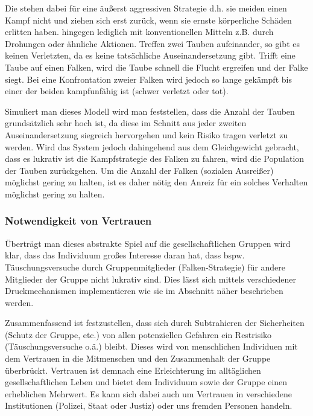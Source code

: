 Die  stehen dabei für eine äußerst aggressiven Strategie d.h. sie meiden einen Kampf nicht und ziehen sich erst zurück, wenn sie ernste körperliche Schäden erlitten haben.
 hingegen  lediglich mit konventionellen Mitteln z.B. durch Drohungen oder ähnliche Aktionen.
Treffen zwei Tauben aufeinander, so gibt es keinen Verletzten, da es keine tatsächliche Auseinandersetzung gibt.
Trifft eine Taube auf einen Falken, wird die Taube schnell die Flucht ergreifen und der Falke siegt.
Bei eine Konfrontation zweier Falken wird jedoch so lange gekämpft bis einer der beiden kampfunfähig ist (schwer verletzt oder tot).

Simuliert man dieses Modell wird man feststellen, dass die Anzahl der Tauben grundsätzlich sehr hoch ist, da diese im Schnitt aus jeder zweiten Auseinandersetzung siegreich hervorgehen und kein Risiko tragen verletzt zu werden.
Wird das System jedoch dahingehend aus dem Gleichgewicht gebracht, dass es lukrativ ist die Kampfstrategie des Falken zu fahren, wird die Population der Tauben zurückgehen.
Um die Anzahl der Falken (sozialen Ausreißer) möglichst gering zu halten, ist es daher nötig den Anreiz für ein solches Verhalten möglichst gering zu halten.
\cite{tauben-falken}

\subsubsection{Notwendigkeit von Vertrauen}\label{sec:notwendigkeit-von-vertauen}
Überträgt man dieses abstrakte Spiel auf die gesellschaftlichen Gruppen wird klar, dass das Individuum großes Interesse daran hat, dass bspw. Täuschungsversuche durch Gruppenmitglieder (Falken-Strategie) für andere Mitglieder der Gruppe nicht lukrativ sind.
Dies lässt sich mittels verschiedener Druckmechanismen implementieren wie sie im Abschnitt  näher beschrieben werden.

Zusammenfassend ist festzustellen, dass sich durch Subtrahieren der Sicherheiten (Schutz der Gruppe, etc.) von allen potenziellen Gefahren ein Restrisiko (Täuschungsversuche o.ä.) bleibt.
Dieses wird von menschlichen Individuen mit dem Vertrauen in die Mitmenschen und den Zusammenhalt der Gruppe überbrückt.
Vertrauen ist demnach eine Erleichterung im alltäglichen gesellschaftlichen Leben und bietet dem Individuum sowie der Gruppe einen erheblichen Mehrwert.
Es kann sich dabei auch um Vertrauen in verschiedene Institutionen (Polizei, Staat oder Justiz) oder uns fremden Personen handeln.
\cite{liars-and-outliers}

